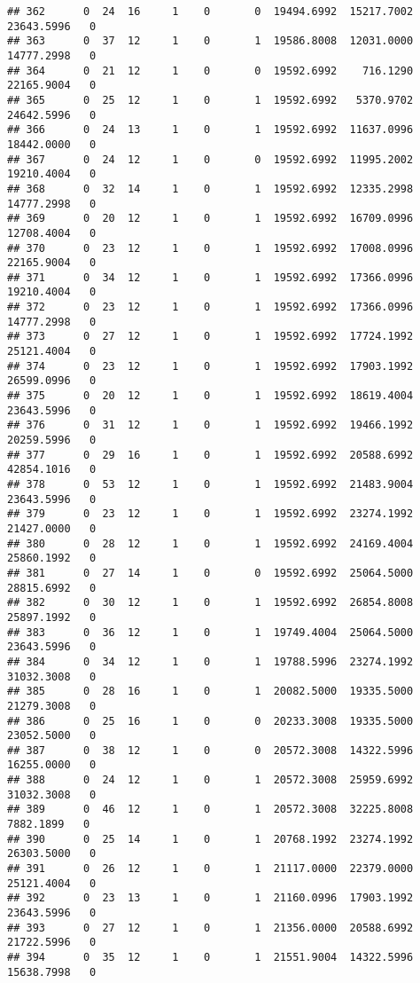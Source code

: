 \documentclass[
]{article}
\begin{document}
\begin{enumerate}
\begin{verbatim}
## 362      0  24  16     1    0       0  19494.6992  15217.7002  23643.5996   0
## 363      0  37  12     1    0       1  19586.8008  12031.0000  14777.2998   0
## 364      0  21  12     1    0       0  19592.6992    716.1290  22165.9004   0
## 365      0  25  12     1    0       1  19592.6992   5370.9702  24642.5996   0
## 366      0  24  13     1    0       1  19592.6992  11637.0996  18442.0000   0
## 367      0  24  12     1    0       0  19592.6992  11995.2002  19210.4004   0
## 368      0  32  14     1    0       1  19592.6992  12335.2998  14777.2998   0
## 369      0  20  12     1    0       1  19592.6992  16709.0996  12708.4004   0
## 370      0  23  12     1    0       1  19592.6992  17008.0996  22165.9004   0
## 371      0  34  12     1    0       1  19592.6992  17366.0996  19210.4004   0
## 372      0  23  12     1    0       1  19592.6992  17366.0996  14777.2998   0
## 373      0  27  12     1    0       1  19592.6992  17724.1992  25121.4004   0
## 374      0  23  12     1    0       1  19592.6992  17903.1992  26599.0996   0
## 375      0  20  12     1    0       1  19592.6992  18619.4004  23643.5996   0
## 376      0  31  12     1    0       1  19592.6992  19466.1992  20259.5996   0
## 377      0  29  16     1    0       1  19592.6992  20588.6992  42854.1016   0
## 378      0  53  12     1    0       1  19592.6992  21483.9004  23643.5996   0
## 379      0  23  12     1    0       1  19592.6992  23274.1992  21427.0000   0
## 380      0  28  12     1    0       1  19592.6992  24169.4004  25860.1992   0
## 381      0  27  14     1    0       0  19592.6992  25064.5000  28815.6992   0
## 382      0  30  12     1    0       1  19592.6992  26854.8008  25897.1992   0
## 383      0  36  12     1    0       1  19749.4004  25064.5000  23643.5996   0
## 384      0  34  12     1    0       1  19788.5996  23274.1992  31032.3008   0
## 385      0  28  16     1    0       1  20082.5000  19335.5000  21279.3008   0
## 386      0  25  16     1    0       0  20233.3008  19335.5000  23052.5000   0
## 387      0  38  12     1    0       0  20572.3008  14322.5996  16255.0000   0
## 388      0  24  12     1    0       1  20572.3008  25959.6992  31032.3008   0
## 389      0  46  12     1    0       1  20572.3008  32225.8008   7882.1899   0
## 390      0  25  14     1    0       1  20768.1992  23274.1992  26303.5000   0
## 391      0  26  12     1    0       1  21117.0000  22379.0000  25121.4004   0
## 392      0  23  13     1    0       1  21160.0996  17903.1992  23643.5996   0
## 393      0  27  12     1    0       1  21356.0000  20588.6992  21722.5996   0
## 394      0  35  12     1    0       1  21551.9004  14322.5996  15638.7998   0

\end{verbatim}
\end{enumerate}
\end{document}
